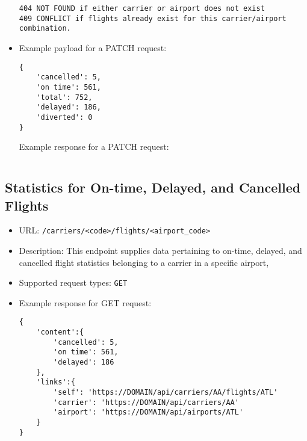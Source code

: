 \documentclass{article}
\begin{document}
\begin{itemize}
\begin{lstlisting}
404 NOT FOUND if either carrier or airport does not exist
409 CONFLICT if flights already exist for this carrier/airport combination.
    			\end{lstlisting}
    			
    			\item Example payload for a PATCH request:
    			\begin{lstlisting}
{
    'cancelled': 5,
    'on time': 561,
    'total': 752,
    'delayed': 186,
    'diverted': 0
}
    			\end{lstlisting}
    			
    			Example response for a PATCH request:
    			\begin{lstlisting}
    			\end{lstlisting}
    		\end{itemize}
    
    \subsection{Statistics for On-time, Delayed, and Cancelled Flights}
        \begin{itemize}
            \item URL: \texttt{/carriers/<code>/flights/<airport\_code>}
            \item Description: This endpoint supplies data pertaining to on-time, delayed, and cancelled flight statistics belonging to a carrier in a specific airport,  
            \item Supported request types: \texttt{GET}
            \item Example response for GET request:
            \begin{lstlisting}
{
    'content':{
        'cancelled': 5,
        'on time': 561,
        'delayed': 186
    },
    'links':{
        'self': 'https://DOMAIN/api/carriers/AA/flights/ATL'
        'carrier': 'https://DOMAIN/api/carriers/AA'
        'airport': 'https://DOMAIN/api/airports/ATL'
    }
}
           \end{lstlisting}
        \end{itemize}
\end{document}

